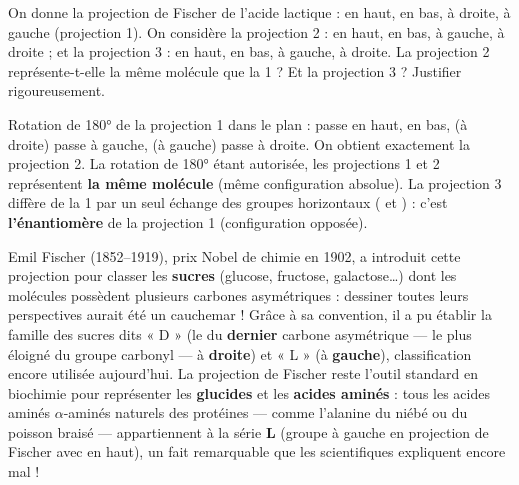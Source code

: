 \documentclass[11pt]{article}
\begin{document}
\begin{exercice}
On donne la projection de Fischer de l'acide lactique :  en haut,  en bas,  à droite,  à gauche (projection 1). On considère la projection 2 :  en haut,  en bas,  à gauche,  à droite ; et la projection 3 :  en haut,  en bas,  à gauche,  à droite. La projection 2 représente-t-elle la même molécule que la 1 ? Et la projection 3 ? Justifier rigoureusement.
\end{exercice}

\begin{corrige}
Rotation de 180° de la projection 1 dans le plan :  passe en haut,  en bas,  (à droite) passe à gauche,  (à gauche) passe à droite. On obtient exactement la projection 2. La rotation de 180° étant autorisée, les projections 1 et 2 représentent \textbf{la même molécule} (même configuration absolue). La projection 3 diffère de la 1 par un seul échange des groupes horizontaux ( et ) : c'est \textbf{l'énantiomère} de la projection 1 (configuration opposée).
\end{corrige}

\begin{savaistu}
Emil Fischer (1852--1919), prix Nobel de chimie en 1902, a introduit cette projection pour classer les \textbf{sucres} (glucose, fructose, galactose\ldots) dont les molécules possèdent plusieurs carbones asymétriques : dessiner toutes leurs perspectives aurait été un cauchemar ! Grâce à sa convention, il a pu établir la famille des sucres dits « D » (le  du \textbf{dernier} carbone asymétrique — le plus éloigné du groupe carbonyl — à \textbf{droite}) et « L » (à \textbf{gauche}), classification encore utilisée aujourd'hui. La projection de Fischer reste l'outil standard en biochimie pour représenter les \textbf{glucides} et les \textbf{acides aminés} : tous les acides aminés $\alpha$-aminés naturels des protéines — comme l'alanine du niébé ou du poisson braisé — appartiennent à la série \textbf{L} (groupe  à gauche en projection de Fischer avec  en haut), un fait remarquable que les scientifiques expliquent encore mal !
\end{savaistu}
\end{document}
